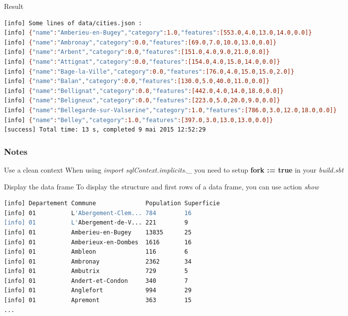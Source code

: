 \documentclass[slidetop,9pt,utf8]{beamer}
\begin{document}
\begin{CJK}{UTF8}{gbsn}
\begin{frame}[fragile]
  \begin{block}{Result}
    \begin{lstlisting}[language=bash, style=terminal]
[info] Some lines of data/cities.json : 
[info] {"name":"Amberieu-en-Bugey","category":1.0,"features":[553.0,4.0,13.0,14.0,0.0]}
[info] {"name":"Ambronay","category":0.0,"features":[69.0,7.0,10.0,13.0,0.0]}
[info] {"name":"Arbent","category":0.0,"features":[151.0,4.0,9.0,21.0,0.0]}
[info] {"name":"Attignat","category":0.0,"features":[154.0,4.0,15.0,14.0,0.0]}
[info] {"name":"Bage-la-Ville","category":0.0,"features":[76.0,4.0,15.0,15.0,2.0]}
[info] {"name":"Balan","category":0.0,"features":[130.0,5.0,40.0,11.0,0.0]}
[info] {"name":"Bellignat","category":0.0,"features":[442.0,4.0,14.0,18.0,0.0]}
[info] {"name":"Beligneux","category":0.0,"features":[223.0,5.0,20.0,9.0,0.0]}
[info] {"name":"Bellegarde-sur-Valserine","category":1.0,"features":[786.0,3.0,12.0,18.0,0.0]}
[info] {"name":"Belley","category":1.0,"features":[397.0,3.0,13.0,13.0,0.0]}
[success] Total time: 13 s, completed 9 mai 2015 12:52:29
    \end{lstlisting}
  \end{block}

\end{frame}

\begin{frame}[fragile]
  \frametitle{Notes}

  \begin{exampleblock}{Use a clean context}
    When using \textit{import sqlContext.implicits.\_} you need to setup \textbf{fork := true} in your \textit{build.sbt}
  \end{exampleblock}

  \begin{exampleblock}{Display the data frame}
    To display the structure and first rows of a data frame, you can use action \textit{show}
  \end{exampleblock}

  \begin{lstlisting}[label=ResultOfShowMethod, caption=Result of Show Method, language=bash, style=terminal]
[info] Departement Commune              Population Superficie
[info] 01          L'Abergement-Clem... 784        16        
[info] 01          L'Abergement-de-V... 221        9         
[info] 01          Amberieu-en-Bugey    13835      25        
[info] 01          Amberieux-en-Dombes  1616       16        
[info] 01          Ambleon              116        6         
[info] 01          Ambronay             2362       34        
[info] 01          Ambutrix             729        5         
[info] 01          Andert-et-Condon     340        7         
[info] 01          Anglefort            994        29        
[info] 01          Apremont             363        15             
...
  \end{lstlisting}


\end{frame}
\end{CJK}
\end{document}
